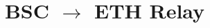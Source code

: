 \usepackage{xspace}
\usepackage{graphicx}
\graphicspath{ {./images/} }
\usepackage{svg}
\usepackage{adjustbox}
\usepackage{xcolor}
\usepackage{amsmath}
\usepackage{mathtools}





	
	\date{}
	
	\title{\Large \bf BSC $\rightarrow$ ETH Relay}
	
	
	\maketitle
	
	
	
	
	
	
	
	
	
	
	


